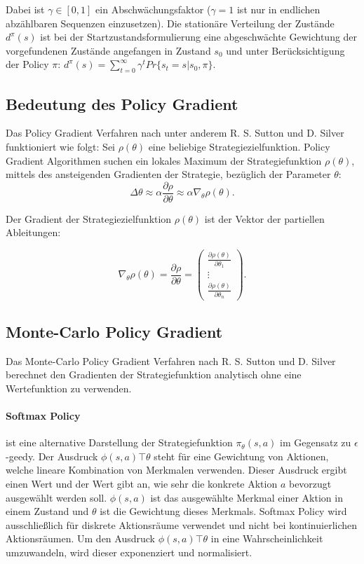 \documentclass[conference]{IEEEtran}
\begin{document}
Dabei ist $\gamma \in [0,1]$ ein Abschwächungsfaktor ($\gamma = 1$ ist nur in endlichen abzählbaren Sequenzen einzusetzen). Die stationäre Verteilung der Zustände $d^\pi (s)$ ist bei der Startzustandsformulierung eine abgeschwächte Gewichtung der vorgefundenen Zustände angefangen in Zustand $s_0$ und unter Berücksichtigung der Policy $\pi$: $d^\pi (s) = \sum^\infty_{t=0} \gamma^t Pr \{s_t = s | s_0, \pi\}$.
 
\subsection{Bedeutung des Policy Gradient}
Das Policy Gradient Verfahren nach unter anderem R. S. Sutton \cite{sutton_99} und D. Silver \cite{silver_15} funktioniert wie folgt:
Sei $\rho(\theta)$ eine beliebige Strategiezielfunktion. Policy Gradient Algorithmen suchen ein lokales Maximum der Strategiefunktion $\rho(\theta)$, mittels des ansteigenden Gradienten der Strategie, bezüglich der Parameter $\theta$:   
\begin{equation*}
\Delta \theta \approx \alpha \frac{\partial \rho}{\partial \theta} \approx \alpha \nabla_\theta \rho(\theta).
\end{equation*}

Der Gradient der Strategiezielfunktion $\rho(\theta)$ ist der Vektor der partiellen Ableitungen:

\begin{equation*}
\nabla_\theta \rho(\theta) = \frac{\partial \rho}{\partial \theta} =
\begin{pmatrix}
\frac{\partial \rho(\theta)}{\partial \theta_1} \\ 
\vdots \\
\frac{\partial \rho(\theta)}{\partial \theta_n}
\end{pmatrix}.
\end{equation*}

\subsection{Monte-Carlo Policy Gradient}
Das Monte-Carlo Policy Gradient Verfahren nach R. S. Sutton \cite{sutton_99} und D. Silver \cite{silver_15} berechnet den Gradienten der Strategiefunktion analytisch ohne eine Wertefunktion zu verwenden.

\paragraph*{Softmax Policy} ist eine alternative Darstellung der Strategiefunktion $\pi_\theta(s,a)$ im Gegensatz zu $\epsilon$-geedy. Der Ausdruck $\phi(s,a) \top \theta$ steht für eine Gewichtung von Aktionen, welche lineare Kombination von Merkmalen verwenden. Dieser Ausdruck ergibt einen Wert und der Wert gibt an, wie sehr die konkrete Aktion $a$ bevorzugt ausgewählt werden soll.  $\phi(s,a)$ ist das ausgewählte Merkmal einer Aktion in einem Zustand und $\theta$ ist die Gewichtung dieses Merkmals. Softmax Policy wird ausschließlich für diskrete Aktionsräume verwendet und nicht bei kontinuierlichen Aktionsräumen. Um den Ausdruck $\phi(s,a) \top \theta$ in eine Wahrscheinlichkeit umzuwandeln, wird dieser exponenziert und normalisiert.
\end{document}
